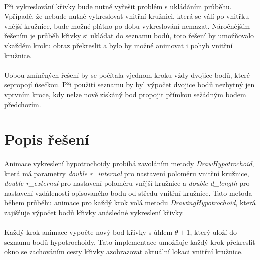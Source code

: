 \documentclass[12pt]{scrartcl}
\begin{document}
\paragraph{}
Při vykreslování křivky bude nutné vyřešit problém s ukládáním průběhu. V\nobreakspace případě, že nebude nutné vykreslovat vnitřní kružnici, která se válí po vnitřku vnější kružnice, bude možné plátno po dobu vykreslování nemazat. Náročnějším řešením je průběh křivky si ukládat do seznamu bodů, toto řešení by umožňovalo v\nobreakspace každém kroku obraz překreslit a bylo by možné animovat i pohyb vnitřní kružnice.

\paragraph{}
U\nobreakspace obou zmíněných řešení by se počítala v\nobreakspace jednom kroku vždy dvojice bodů, které se\nobreakspace propojí úsečkou. Při použití seznamu by byl výpočet dvojice bodů nezbytný jen v\nobreakspace prvním kroce, kdy nelze nově získáný bod propojit přímkou se\nobreakspace žádným bodem předchozím.

\newpage
\section{Popis řešení}

\paragraph{}

Animace vykreslení hypotrochoidy probíhá zavoláním metody \emph{DrawHypotrochoid}, která má parametry \emph{double r\_internal} pro nastavení poloměru vnitřní kružnice, \emph{double r\_external} pro nastavení poloměru vnější kružnice a \emph{double d\_length} pro nastavení vzdálenosti opisovaného bodu od středu vnitřní kružnice. Tato metoda během průběhu animace pro každý krok volá metodu \emph{DrawingHypotrochoid}, která zajišťuje výpočet bodů křivky a\nobreakspace následné vykreslení křivky.

\paragraph{}
Každý krok animace vypočte nový bod křivky s úhlem $\theta + 1$, který uloží do seznamu bodů hypotrochoidy. Tato implementace umožňuje každý krok překreslit okno se zachováním cesty křivky a\nobreakspace zobrazovat aktuální lokaci vnitřní kružnice. 
\end{document}
